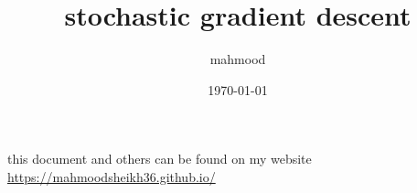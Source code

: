 \documentclass[a4paper,12pt]{article}
\author{mahmood}
\date{\today}
\title{stochastic gradient descent}
\begin{document}
\maketitle
\begin{note}
this document and others can be found on my website\\
\url{https://mahmoodsheikh36.github.io/}
\end{note}
\end{document}
